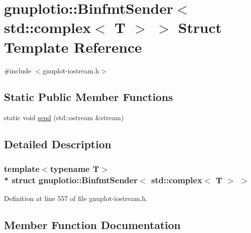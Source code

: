 \hypertarget{structgnuplotio_1_1_binfmt_sender_3_01std_1_1complex_3_01_t_01_4_01_4}{}\section{gnuplotio\+:\+:Binfmt\+Sender$<$ std\+:\+:complex$<$ T $>$ $>$ Struct Template Reference}
\label{structgnuplotio_1_1_binfmt_sender_3_01std_1_1complex_3_01_t_01_4_01_4}


{\ttfamily \#include $<$gnuplot-\/iostream.\+h$>$}

\subsection*{Static Public Member Functions}
\begin{DoxyCompactItemize}
\item 
static void \hyperlink{structgnuplotio_1_1_binfmt_sender_3_01std_1_1complex_3_01_t_01_4_01_4_a64633d068c93ef2822ee3aa6ef39d623}{send} (std\+::ostream \&stream)
\end{DoxyCompactItemize}


\subsection{Detailed Description}
\subsubsection*{template$<$typename T$>$\\*
struct gnuplotio\+::\+Binfmt\+Sender$<$ std\+::complex$<$ T $>$ $>$}



Definition at line 557 of file gnuplot-\/iostream.\+h.



\subsection{Member Function Documentation}
